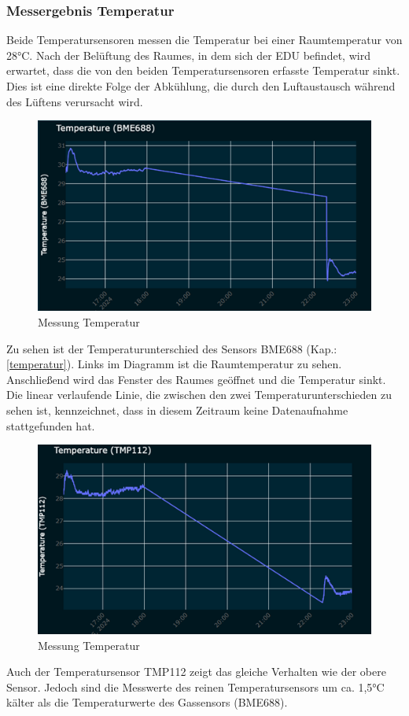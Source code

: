\subsubsection {Messergebnis Temperatur}
Beide Temperatursensoren messen die Temperatur bei einer Raumtemperatur von 28°C. Nach der Belüftung des Raumes, in dem sich der EDU befindet, wird erwartet, dass die von den beiden Temperatursensoren erfasste Temperatur sinkt. Dies ist eine direkte Folge der Abkühlung, die durch den Luftaustausch während des Lüftens verursacht wird.\\
\vspace{3mm}
\begin{figure}[H]
	\centering
	\includegraphics[scale = 1]{image/tempmess1.png}
	\caption{Messung Temperatur}
	\label{fig:enter-label}
\end{figure}
\vspace{3mm}
Zu sehen ist der Temperaturunterschied des Sensors BME688 (Kap.:\ref{temperatur}). Links im Diagramm ist die Raumtemperatur zu sehen. Anschließend wird das Fenster des Raumes geöffnet und die Temperatur sinkt. Die linear verlaufende Linie, die zwischen den zwei Temperaturunterschieden zu sehen ist, kennzeichnet, dass in diesem Zeitraum keine Datenaufnahme stattgefunden hat.
\vspace{3mm}
\begin{figure}[H]
	\centering
	\includegraphics[scale=1]{image/temp2mess.png}
	\caption{Messung Temperatur}
	\label{fig:enter-label}
\end{figure}
\vspace{3mm}
Auch der Temperatursensor TMP112 zeigt das gleiche Verhalten wie der obere Sensor. Jedoch sind die Messwerte des reinen Temperatursensors um ca. 1,5°C kälter als die Temperaturwerte des Gassensors (BME688).

